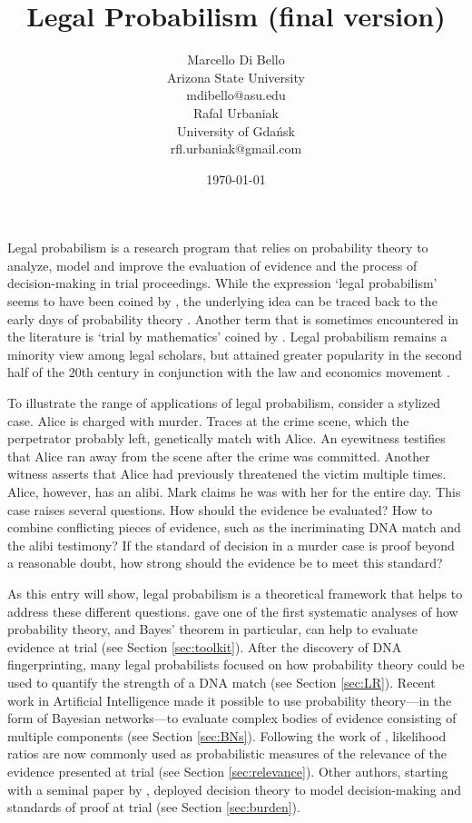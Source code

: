 \documentclass{article}
\title{Legal Probabilism (final version)}
\author{Marcello Di Bello\\Arizona State University\\  mdibello@asu.edu 
   \vspace{4mm} \\   
  Rafal Urbaniak\\ 
  University of Gda\' nsk \\
  rfl.urbaniak@gmail.com
  }
\date{\today}
\begin{document}
\maketitle


\thispagestyle{empty}
Legal probabilism is a research program that relies on probability theory to analyze, model and improve the evaluation of evidence and the process of decision-making in trial proceedings. While the expression `legal probabilism'  seems to have been coined by \citet{haack2011legal}, the underlying idea can be traced back to the early days of probability theory
\cite[see, for example,][]{Bernoulli1713Ars-conjectandi}. Another term that is sometimes encountered in the literature is `trial by mathematics' coined by \cite{tribe71}.   Legal probabilism remains a minority view among legal scholars, but attained greater popularity in the second half of the 20th century in conjunction with   the law and economics movement \citep{Calabresi1961, becker1968crime, Posner1973}. 

 To illustrate the range of applications of legal probabilism, consider a  stylized case. Alice is charged
with murder. Traces at the crime scene, which the perpetrator probably left, genetically match with Alice. An eyewitness testifies that Alice ran away from the scene after  the crime was committed. Another witness asserts that Alice had previously threatened the victim  multiple times. Alice, however, has an alibi. Mark claims he was with her for the entire day. This case raises several questions. How should the evidence be evaluated?  How to combine conflicting pieces of evidence, such as the incriminating DNA match and the alibi testimony? 
 If the standard of decision in a murder case is proof beyond a reasonable doubt, how strong should the  evidence be to meet this standard? 

As this entry will show, legal probabilism is a theoretical framework that helps to address these different questions. 
\cite{Finkelstein1970A} gave one of the first systematic analyses of how probability theory, and Bayes' theorem in particular, can help to evaluate evidence at trial 
(see Section \ref{sec:toolkit}). 
After the discovery of DNA fingerprinting, many legal probabilists focused on how probability theory could be used to quantify the strength of a DNA match 
(see Section \ref{sec:LR}).
 Recent work in Artificial Intelligence made it possible to use probability theory---in the form of Bayesian networks---to evaluate complex bodies of evidence consisting of multiple components  (see Section  \ref{sec:BNs}). 
Following the work of \cite{lempert1977modeling},
 likelihood ratios are now commonly used as  probabilistic measures of the relevance of the evidence presented at trial (see Section \ref{sec:relevance}).
Other  authors, starting with a seminal paper by \cite{kaplan1968decision},  deployed decision theory   to model decision-making and standards of proof at trial  (see Section \ref{sec:burden}). 
\end{document}
